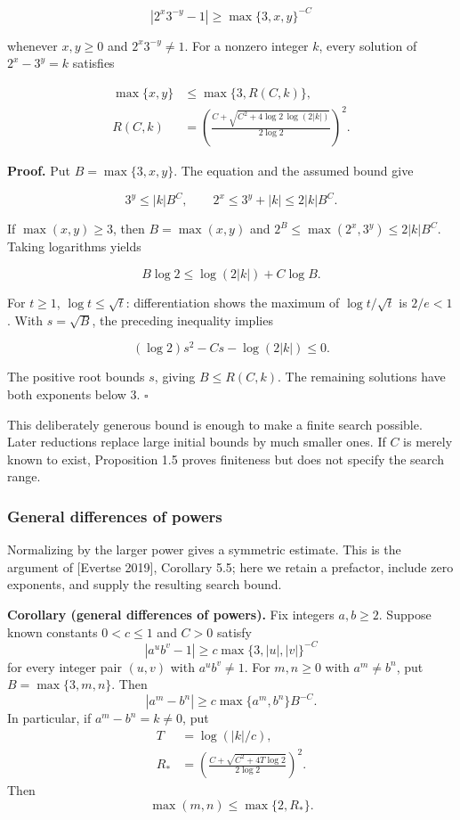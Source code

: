 \documentclass[
  11pt,
  a4paper,
]{article}
\begin{document}
\[
|2^x3^{-y}-1|\ge\max\{3,x,y\}^{-C}
\]

whenever \(x,y\ge0\) and \(2^x3^{-y}\ne1\). For a nonzero integer \(k\),
every solution of \(2^x-3^y=k\) satisfies

\[
\begin{aligned}
\max\{x,y\}&\le\max\{3,R(C,k)\},\\
R(C,k)&=\left(\frac{C+\sqrt{C^2+4\log2\,\log(2|k|)}}{2\log2}\right)^2.
\end{aligned}
\]

\textbf{Proof.} Put \(B=\max\{3,x,y\}\). The equation and the assumed
bound give

\[
3^y\le|k|B^C,
\qquad 2^x\le3^y+|k|\le2|k|B^C.
\]

If \(\max(x,y)\ge3\), then \(B=\max(x,y)\) and
\(2^B\le\max(2^x,3^y)\le2|k|B^C\). Taking logarithms yields

\[
B\log2\le\log(2|k|)+C\log B.
\]

For \(t\ge1\), \(\log t\le\sqrt t\): differentiation shows the maximum
of \(\log t/\sqrt t\) is \(2/e<1\). With \(s=\sqrt B\), the preceding
inequality implies

\[
(\log2)s^2-Cs-\log(2|k|)\le0.
\]

The positive root bounds \(s\), giving \(B\le R(C,k)\). The remaining
solutions have both exponents below \(3\). \(\square\)

This deliberately generous bound is enough to make a finite search
possible. Later reductions replace large initial bounds by much smaller
ones. If \(C\) is merely known to exist, Proposition 1.5 proves
finiteness but does not specify the search range.

\subsubsection{General differences of
powers}\label{general-differences-of-powers}

Normalizing by the larger power gives a symmetric estimate. This is the
argument of {[}Evertse 2019{]}, Corollary 5.5; here we retain a
prefactor, include zero exponents, and supply the resulting search
bound.

\textbf{Corollary (general differences of powers).} Fix integers
\(a,b\ge2\). Suppose known constants \(0<c\le1\) and \(C>0\) satisfy \[
|a^u b^v-1|\ge c\max\{3,|u|,|v|\}^{-C}
\] for every integer pair \((u,v)\) with \(a^u b^v\ne1\). For
\(m,n\ge0\) with \(a^m\ne b^n\), put \(B=\max\{3,m,n\}\). Then \[
|a^m-b^n|\ge c\max\{a^m,b^n\}B^{-C}.
\] In particular, if \(a^m-b^n=k\ne0\), put \[
\begin{aligned}
T&=\log(|k|/c),\\
R_*&=\left(\frac{C+\sqrt{C^2+4T\log2}}{2\log2}\right)^2.
\end{aligned}
\] Then \[
\max(m,n)\le\max\{2,R_*\}.
\]
\end{document}
